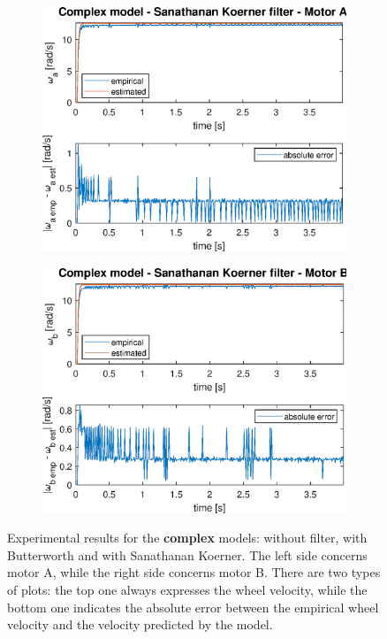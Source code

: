 \documentclass[a4paper,kul]{kulakarticle} %
\begin{document}
\begin{figure}[htp!]
\begin{subfigure}[b]{0.48\textwidth}
		\includegraphics[width=\linewidth]{step_response_complex_SK_a.eps}
	\end{subfigure}
	\hfill
	\begin{subfigure}[b]{0.48\textwidth}
		\centering
		\includegraphics[width=\linewidth]{step_response_complex_SK_b.eps}
	\end{subfigure}
	\caption[Experimental results for the complex models]{Experimental results for the \textbf{complex} models: without filter, with Butterworth and with Sanathanan Koerner. The left side concerns motor A, while the right side concerns motor B. There are two types of plots: the top one always expresses the wheel velocity, while the bottom one indicates the absolute error between the empirical wheel velocity and the velocity predicted by the model.}
	\label{fig:validation_complex}
\end{figure}
\end{document}
